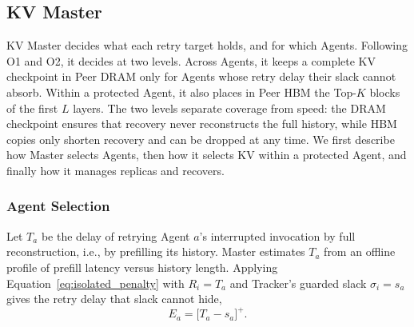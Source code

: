 \subsection{KV Master}
\label{sec:master}

KV Master decides what each retry target holds, and for which Agents.
Following O1 and O2, it decides at two levels. Across Agents, it keeps a
complete KV checkpoint in Peer DRAM only for Agents whose retry delay
their slack cannot absorb. Within a protected Agent, it also places in
Peer HBM the Top-$K$ blocks of the first $L$ layers. The two
levels separate coverage from speed: the DRAM checkpoint ensures that
recovery never reconstructs the full history, while HBM copies only
shorten recovery and can be dropped at any time. We first describe how
Master selects Agents, then how it selects KV within a protected Agent,
and finally how it manages replicas and recovers.

\subsubsection{Agent Selection}
\label{sec:agent-protection}

Let $T_a$ be the delay of retrying Agent $a$'s interrupted invocation by
full reconstruction, i.e., by prefilling its history. Master estimates
$T_a$ from an offline profile of prefill latency versus history length.
Applying Equation~\ref{eq:isolated_penalty} with $R_i=T_a$ and Tracker's
guarded slack $\sigma_i=s_a$ gives the retry delay that slack cannot hide,
\begin{equation}
 E_a=\bigl[T_a-s_a\bigr]^+.
 \label{eq:exposed-delay}
\end{equation}

